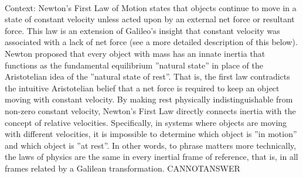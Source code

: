 \documentclass[11pt,a4paper, onecolumn]{article}
\begin{document}
\\ Context: Newton's First Law of Motion states that objects continue to move in a state of constant velocity unless acted upon by an external net force or resultant force. This law is an extension of Galileo's insight that constant velocity was associated with a lack of net force (see a more detailed description of this below). Newton proposed that every object with mass has an innate inertia that functions as the fundamental equilibrium ''natural state'' in place of the Aristotelian idea of the ''natural state of rest''. That is, the first law contradicts the intuitive Aristotelian belief that a net force is required to keep an object moving with constant velocity. By making rest physically indistinguishable from non-zero constant velocity, Newton's First Law directly connects inertia with the concept of relative velocities. Specifically, in systems where objects are moving with different velocities, it is impossible to determine which object is ''in motion'' and which object is ''at rest''. In other words, to phrase matters more technically, the laws of physics are the same in every inertial frame of reference, that is, in all frames related by a Galilean transformation. CANNOTANSWER
\end{document}
